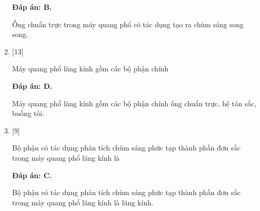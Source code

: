 \begin{enumerate}[label=\bfseries Câu \arabic*:]
	\loigiai
	{		\textbf{Đáp án: B.}
		
		Ống chuẩn trực trong máy quang phổ có tác dụng tạo ra chùm sáng song song. 
	}
	
	\item {} [13]
	\cauhoi
	{Máy quang phổ lăng kính gồm các bộ phận chính
	}
	
	\loigiai
	{		\textbf{Đáp án: D.}
		
		Máy quang phổ lăng kính gồm các bộ phận chính ống chuẩn trực, hệ tán sắc, buồng tối.
	}
	
	\item {} [9]
	\cauhoi
	{Bộ phận có tác dụng phân tích chùm sáng phức tạp thành phần đơn sắc trong máy quang phổ lăng kính là 
	}
	
	\loigiai
	{		\textbf{Đáp án: C.}
		
		Bộ phận có tác dụng phân tích chùm sáng phức tạp thành phần đơn sắc trong máy quang phổ lăng kính là lăng kính. 
	}
	
\end{enumerate}

